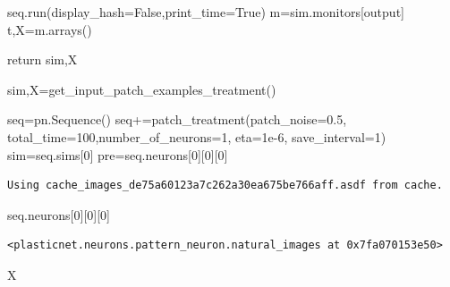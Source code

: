\documentclass[
  letterpaper,
  DIV=11,
  numbers=noendperiod]{scrreprt}
\newenvironment{Shaded}{\begin{snugshade}}{\end{snugshade}}
\newcommand{\ControlFlowTok}[1]{\textcolor[rgb]{0.00,0.23,0.31}{#1}}
\newcommand{\DecValTok}[1]{\textcolor[rgb]{0.68,0.00,0.00}{#1}}
\newcommand{\FloatTok}[1]{\textcolor[rgb]{0.68,0.00,0.00}{#1}}
\newcommand{\NormalTok}[1]{\textcolor[rgb]{0.00,0.23,0.31}{#1}}
\newcommand{\OperatorTok}[1]{\textcolor[rgb]{0.37,0.37,0.37}{#1}}
\newcommand{\StringTok}[1]{\textcolor[rgb]{0.13,0.47,0.30}{#1}}
\newcommand{\VariableTok}[1]{\textcolor[rgb]{0.07,0.07,0.07}{#1}}
\begin{document}
\begin{Shaded}
\begin{Highlighting}[]
\NormalTok{    seq.run(display\_hash}\OperatorTok{=}\VariableTok{False}\NormalTok{,print\_time}\OperatorTok{=}\VariableTok{True}\NormalTok{)}
\NormalTok{    m}\OperatorTok{=}\NormalTok{sim.monitors[}\StringTok{\textquotesingle{}output\textquotesingle{}}\NormalTok{]}
\NormalTok{    t,X}\OperatorTok{=}\NormalTok{m.arrays()    }
    
    \ControlFlowTok{return}\NormalTok{ sim,X}

\NormalTok{sim,X}\OperatorTok{=}\NormalTok{get\_input\_patch\_examples\_treatment()}
\end{Highlighting}
\end{Shaded}

\begin{Shaded}
\begin{Highlighting}[]
\NormalTok{    seq}\OperatorTok{=}\NormalTok{pn.Sequence()    }
\NormalTok{    seq}\OperatorTok{+=}\NormalTok{patch\_treatment(patch\_noise}\OperatorTok{=}\FloatTok{0.5}\NormalTok{,}
\NormalTok{               total\_time}\OperatorTok{=}\DecValTok{100}\NormalTok{,number\_of\_neurons}\OperatorTok{=}\DecValTok{1}\NormalTok{,}
\NormalTok{               eta}\OperatorTok{=}\FloatTok{1e{-}6}\NormalTok{,}
\NormalTok{               save\_interval}\OperatorTok{=}\DecValTok{1}\NormalTok{)}
\NormalTok{    sim}\OperatorTok{=}\NormalTok{seq.sims[}\DecValTok{0}\NormalTok{]}
\NormalTok{    pre}\OperatorTok{=}\NormalTok{seq.neurons[}\DecValTok{0}\NormalTok{][}\DecValTok{0}\NormalTok{][}\DecValTok{0}\NormalTok{]}
\end{Highlighting}
\end{Shaded}

\begin{verbatim}
Using cache_images_de75a60123a7c262a30ea675be766aff.asdf from cache.
\end{verbatim}

\begin{Shaded}
\begin{Highlighting}[]
\NormalTok{seq.neurons[}\DecValTok{0}\NormalTok{][}\DecValTok{0}\NormalTok{][}\DecValTok{0}\NormalTok{]}
\end{Highlighting}
\end{Shaded}

\begin{verbatim}
<plasticnet.neurons.pattern_neuron.natural_images at 0x7fa070153e50>
\end{verbatim}

\begin{Shaded}
\begin{Highlighting}[]
\NormalTok{X}
\end{Highlighting}
\end{Shaded}
\end{document}

